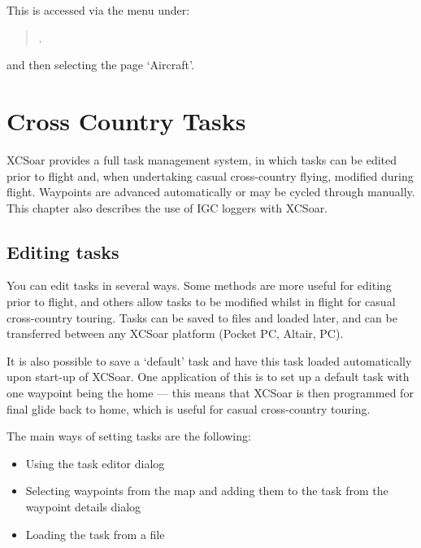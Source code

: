 \documentclass[a4paper,12pt]{refrep}
\begin{document}
This is accessed via the menu under: 
\begin{quote}
\blink{}\blink{}.
\end{quote}
and then selecting the page `Aircraft'.

\chapter{Cross Country Tasks}\label{cha:tasks}

XCSoar provides a full task management system, in which tasks can be
edited prior to flight and, when undertaking casual cross-country
flying, modified during flight.  Waypoints are advanced automatically
or may be cycled through manually.  This chapter also describes the
use of IGC loggers with XCSoar.

\section{Editing tasks}

You can edit tasks in several ways.  Some methods are more useful for
editing prior to flight, and others allow tasks to be modified whilst
in flight for casual cross-country touring.  Tasks can be saved to
files and loaded later, and can be transferred between any XCSoar
platform (Pocket PC, Altair, PC).

\tip It is also possible to save a `default' task and have this task loaded
automatically upon start-up of XCSoar.  One application of this is to
set up a default task with one waypoint being the home --- this means
that XCSoar is then programmed for final glide back to home, which is
useful for casual cross-country touring.

The main ways of setting tasks are the following:
\begin{itemize}
\item Using the task editor dialog
\item Selecting waypoints from the map and adding them to the task from the
 waypoint details dialog
\item Loading the task from a file
\end{itemize}

%
\end{document}
